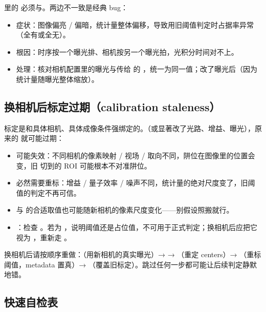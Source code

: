 \documentclass[11pt,oneside,openany]{book}
\begin{document}
 里的  必须与。两边不一致是经典 bug：

\begin{itemize}
\item 症状：图像偏亮 / 偏暗，统计量整体偏移，导致用旧阈值判定时占据率异常（全有或全无）。
\item 根因：时序按一个曝光排、相机按另一个曝光拍，光积分时间对不上。
\item 处理：核对相机配置里的曝光与传给  的 ，统一为同一值；改了曝光后（因为统计量随曝光整体缩放）。
\end{itemize}

\subsection{换相机后标定过期（calibration staleness）}

标定是和具体相机、具体成像条件强绑定的。（或显著改了光路、增益、曝光），原来的  就可能过期：

\begin{itemize}
\item {} 可能失效：不同相机的像素映射 / 视场 / 取向不同，阱位在图像里的位置会变，旧  切到的 ROI 可能根本不对准阱位。
\item {} 必然需要重标：增益 / 量子效率 / 噪声不同，统计量的绝对尺度变了，旧阈值的判定不再可信。
\item {} 与  的合适取值也可能随新相机的像素尺度变化——别假设照搬就行。
\item {}：检查 。若为 ，说明阈值还是占位值，不可用于正式判定；换相机后应把它视为 ，重新走 。
\end{itemize}

\begin{notebox}[换相机后的标准复位动作]
换相机后请按顺序重做：（用新相机的真实曝光）→  → （重定 centers）→ （重标阈值，metadata 置真）→ （覆盖旧标定）。跳过任何一步都可能让后续判定静默地错。
\end{notebox}

\subsection{快速自检表}
\end{document}
